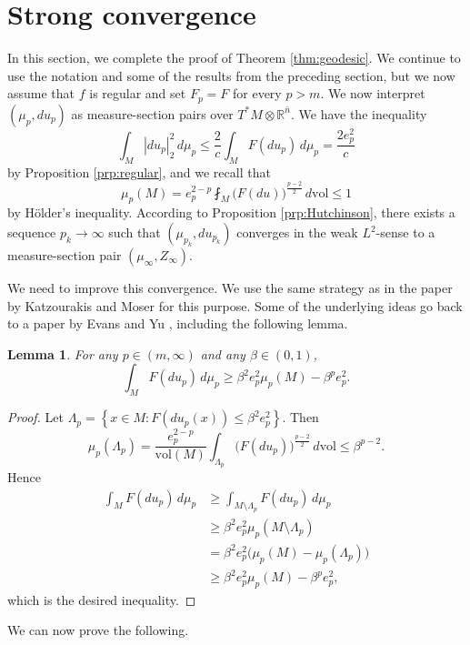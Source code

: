 \documentclass[a4paper]{article}
\newcommand{\R}{\mathbb{R}}
\newcommand{\vol}{\mathrm{vol}}
\newcommand{\ndim}{{\bar{n}}}
\newcommand{\set}[2]{\left\{ #1 \colon #2 \right\}}
\newtheorem{lemma}[theorem]{Lemma}
\theoremstyle{definition}
\theoremstyle{remark}
\begin{document}
\section{Strong convergence} \label{sct:strong-convergence}

In this section, we complete the proof of Theorem \ref{thm:geodesic}.
We continue to use the notation and some of the results from the preceding section, but we now assume that $f$ is regular and set
$F_p = F$ for every $p > m$. We now interpret $(\mu_p, du_p)$ as
measure-section pairs over $T^*M \otimes \R^\ndim$. We have the inequality
\[
\int_M |du_p|_2^2 \, d\mu_p \le \frac{2}{c} \int_M F(du_p) \, d\mu_p = \frac{2e_p^2}{c}
\]
by Proposition \ref{prp:regular}, and we recall that
\[
\mu_p(M) = e_p^{2 - p} \fint_M \bigl(F(du)\bigr)^{\frac{p - 2}{2}} \, d\vol \le 1
\]
by H\"older's inequality. According to Proposition \ref{prp:Hutchinson},
there exists a sequence $p_k \to \infty$ such that $(\mu_{p_k}, du_{p_k})$ converges in the weak $L^2$-sense
to a measure-section pair $(\mu_\infty, Z_\infty)$.

We need to improve this convergence. We use the same strategy as in the paper by
Katzourakis and Moser \cite{Katzourakis-Moser:25} for this purpose. Some of the underlying ideas go back
to a paper by Evans and Yu \cite{Evans-Yu:05}, including the following lemma.

\begin{lemma} \label{lem:energy-estimate}
For any $p \in (m, \infty)$ and any $\beta \in (0, 1)$,
\[
\int_M F(du_p) \, d\mu_p \ge \beta^2 e_p^2 \mu_p(M) - \beta^p e_p^2.
\]
\end{lemma}

\begin{proof}
Let $\Lambda_p = \set{x \in M}{F(du_p(x)) \le \beta^2 e_p^2}$. Then
\[
\mu_p(\Lambda_p) = \frac{e_p^{2 - p}}{\vol(M)} \int_{\Lambda_p} \bigl(F(du_p)\bigr)^{\frac{p - 2}{2}} \, d\vol \le \beta^{p - 2}.
\]
Hence
\[
\begin{split}
\int_M F(du_p) \, d\mu_p & \ge \int_{M \setminus \Lambda_p} F(du_p) \, d\mu_p \\
& \ge \beta^2 e_p^2 \mu_p(M \setminus \Lambda_p) \\
& = \beta^2 e_p^2 \bigl(\mu_p(M) - \mu_p(\Lambda_p)\bigr) \\
& \ge \beta^2 e_p^2 \mu_p(M) - \beta^p e_p^2,
\end{split}
\]
which is the desired inequality.
\end{proof}

We can now prove the following.
\end{document}
